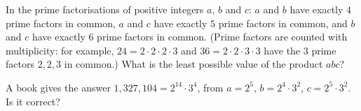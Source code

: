 In the prime factorisations of positive integers $a$, $b$ and $c$: $a$ and $b$ have exactly $4$ prime factors in common, $a$ and $c$ have exactly $5$ prime factors in common, and $b$ and $c$ have exactly $6$ prime factors in common. (Prime factors are counted with multiplicity: for example, $24=2\cdot2\cdot2\cdot3$ and $36=2\cdot2\cdot3\cdot3$ have the $3$ prime factors $2,2,3$ in common.) What is the least possible value of the product $abc$?

A book gives the answer $1{,}327{,}104=2^{14}\cdot3^4$, from $a=2^5$, $b=2^4\cdot3^2$, $c=2^5\cdot3^2$. Is it correct?
